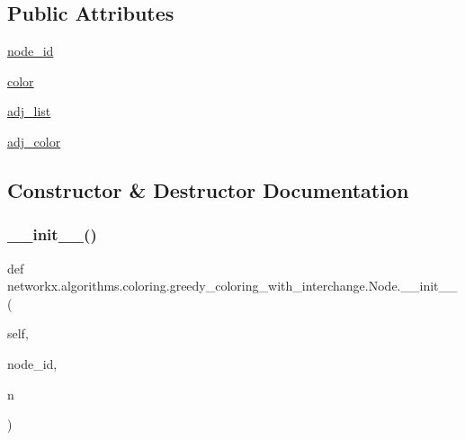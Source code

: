\subsection*{Public Attributes}
\begin{DoxyCompactItemize}
\item 
\hyperlink{classnetworkx_1_1algorithms_1_1coloring_1_1greedy__coloring__with__interchange_1_1Node_a2002c3931dc32e43e7f7794dbc784cea}{node\+\_\+id}
\item 
\hyperlink{classnetworkx_1_1algorithms_1_1coloring_1_1greedy__coloring__with__interchange_1_1Node_ad96e88ded38077079700b2104a854ae2}{color}
\item 
\hyperlink{classnetworkx_1_1algorithms_1_1coloring_1_1greedy__coloring__with__interchange_1_1Node_a09efe80f5ddbf11288a0ff0b22452777}{adj\+\_\+list}
\item 
\hyperlink{classnetworkx_1_1algorithms_1_1coloring_1_1greedy__coloring__with__interchange_1_1Node_a2d296cbced20625df2fa15359301418c}{adj\+\_\+color}
\end{DoxyCompactItemize}


\subsection{Constructor \& Destructor Documentation}
\mbox{\label{classnetworkx_1_1algorithms_1_1coloring_1_1greedy__coloring__with__interchange_1_1Node_aea4a33a355a8f70fb389bffddef27517}} 
\subsubsection{\texorpdfstring{\+\_\+\+\_\+init\+\_\+\+\_\+()}{\_\_init\_\_()}}
{\footnotesize\ttfamily def networkx.\+algorithms.\+coloring.\+greedy\+\_\+coloring\+\_\+with\+\_\+interchange.\+Node.\+\_\+\+\_\+init\+\_\+\+\_\+ (\begin{DoxyParamCaption}\item[{}]{self,  }\item[{}]{node\+\_\+id,  }\item[{}]{n }\end{DoxyParamCaption})}



